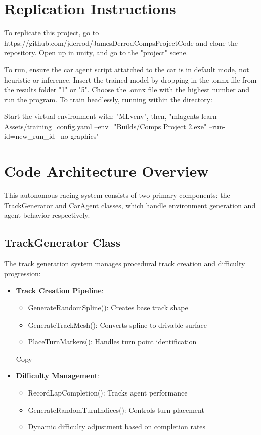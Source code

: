 \documentclass[10pt,twocolumn]{article}
\begin{document}
\section{Replication Instructions}
To replicate this project, go to https://github.com/jderrod/JamesDerrodCompsProjectCode and clone the repository. Open up in unity, and go to the "project" scene. 

To run, ensure the car agent script attatched to the car is in default mode, not heuristic or inference. Insert the trained model by dropping in the .onnx file from the results folder "1" or "5". Choose the .onnx file with the highest number and run the program. To train headlessly,  running within the directory:

Start the virtual environment with: "MLvenv\Scripts\activate", then,
"mlagents-learn Assets/training_config.yaml --env="Builds/Comps Project 2.exe" --run-id=new_run_id --no-graphics"

\section{Code Architecture Overview}
This autonomous racing system consists of two primary components: the TrackGenerator and CarAgent classes, which handle environment generation and agent behavior respectively.
\subsection{TrackGenerator Class}
The track generation system manages procedural track creation and difficulty progression:
\begin{itemize}
\item \textbf{Track Creation Pipeline}:
\begin{itemize}
\item GenerateRandomSpline(): Creates base track shape
\item GenerateTrackMesh(): Converts spline to drivable surface
\item PlaceTurnMarkers(): Handles turn point identification
\end{itemize}
Copy\item \textbf{Difficulty Management}:
\begin{itemize}
    \item RecordLapCompletion(): Tracks agent performance
    \item GenerateRandomTurnIndices(): Controls turn placement
    \item Dynamic difficulty adjustment based on completion rates
\end{itemize}
\end{itemize}
\end{document}
